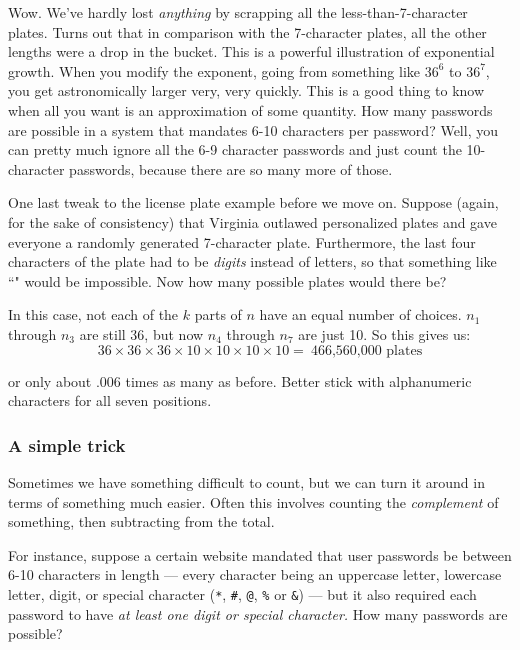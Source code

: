 Wow. We've hardly lost \textit{anything} by scrapping all the
less-than-7-character plates. Turns out that in comparison with the
7-character plates, all the other lengths were a drop in the bucket. This
is a powerful illustration of exponential growth. When you modify the
exponent, going from something like $36^6$ to $36^7$, you get
astronomically larger very, very quickly. This is a good thing to know when
all you want is an approximation of some quantity. How many passwords are
possible in a system that mandates 6-10 characters per password? Well, you
can pretty much ignore all the 6-9 character passwords and just count the
10-character passwords, because there are so many more of those.

One last tweak to the license plate example before we move on. Suppose
(again, for the sake of consistency) that Virginia outlawed personalized
plates and gave everyone a randomly generated 7-character plate.
Furthermore, the last four characters of the plate had to be
\textit{digits} instead of letters, so that something like
``" would be impossible. Now how many possible plates would
there be?

In this case, not each of the $k$ parts of $n$ have an equal number of
choices. $n_1$ through $n_3$ are still 36, but now $n_4$ through $n_7$ are
just 10. So this gives us:
\[
36 \times 36 \times 36 \times 10 \times 10 \times 10 \times 10 =\ 
\text{466,560,000 plates}
\]

or only about .006 times as many as before. Better stick with alphanumeric
characters for all seven positions.


\subsubsection{A simple trick}

Sometimes we have something difficult to count, but we can turn it around
in terms of something much easier. Often this involves counting the
\textit{complement} of something, then subtracting from the total.

For instance, suppose a certain website mandated that user passwords be
between 6-10 characters in length --- every character being an uppercase
letter, lowercase letter, digit, or special character (\texttt{*},
\texttt{\#}, \texttt{@}, \texttt{\%} or \texttt{\&}) --- but it also
required each password to have \textit{at least one digit or special
character.} How many passwords are possible?

